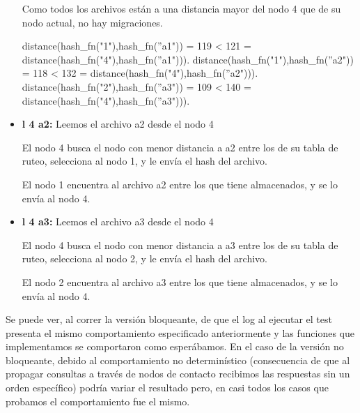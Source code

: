 \begin{itemize}
        Como todos los archivos están a una distancia mayor del nodo 4 que de su nodo actual,
        no hay migraciones.

        distance(hash\_fn("1"),hash\_fn(''a1")) = 119 < 121 = distance(hash\_fn("4"),hash\_fn(''a1"))).
        distance(hash\_fn("1"),hash\_fn(''a2")) = 118 < 132 = distance(hash\_fn("4"),hash\_fn(''a2"))).
        distance(hash\_fn("2"),hash\_fn(''a3")) = 109 < 140 = distance(hash\_fn("4"),hash\_fn(''a3"))).

    \item \textbf{l 4 a2:} Leemos el archivo a2 desde el nodo 4

        El nodo 4 busca el nodo con menor distancia a a2 entre los de su tabla de ruteo,
        selecciona al nodo 1, y le envía el hash del archivo.

        El nodo 1 encuentra al archivo a2 entre los que tiene almacenados, y se lo envía al
        nodo 4.

    \item \textbf{l 4 a3:} Leemos el archivo a3 desde el nodo 4

        El nodo 4 busca el nodo con menor distancia a a3 entre los de su tabla de ruteo,
        selecciona al nodo 2, y le envía el hash del archivo.

        El nodo 2 encuentra al archivo a3 entre los que tiene almacenados, y se lo envía al
        nodo 4.

\end{itemize}

Se puede ver, al correr la versión bloqueante, de que el log al ejecutar el test presenta el mismo comportamiento especificado anteriormente y las funciones que implementamos se comportaron como esperábamos. En el caso de la versión no bloqueante, debido al comportamiento no determinístico (consecuencia de que al propagar consultas a través de nodos de contacto recibimos las respuestas sin un orden específico) podría variar el resultado pero, en casi todos los casos que probamos el comportamiento fue el mismo.
